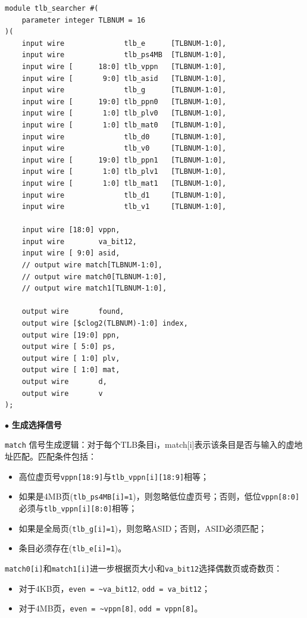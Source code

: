 \begin{lstlisting}
module tlb_searcher #(
    parameter integer TLBNUM = 16
)(
    input wire              tlb_e      [TLBNUM-1:0],
    input wire              tlb_ps4MB  [TLBNUM-1:0],
    input wire [      18:0] tlb_vppn   [TLBNUM-1:0],
    input wire [       9:0] tlb_asid   [TLBNUM-1:0],
    input wire              tlb_g      [TLBNUM-1:0],
    input wire [      19:0] tlb_ppn0   [TLBNUM-1:0],
    input wire [       1:0] tlb_plv0   [TLBNUM-1:0],
    input wire [       1:0] tlb_mat0   [TLBNUM-1:0],
    input wire              tlb_d0     [TLBNUM-1:0],
    input wire              tlb_v0     [TLBNUM-1:0],
    input wire [      19:0] tlb_ppn1   [TLBNUM-1:0],
    input wire [       1:0] tlb_plv1   [TLBNUM-1:0],
    input wire [       1:0] tlb_mat1   [TLBNUM-1:0],
    input wire              tlb_d1     [TLBNUM-1:0],
    input wire              tlb_v1     [TLBNUM-1:0],

    input wire [18:0] vppn,
    input wire        va_bit12,
    input wire [ 9:0] asid,
    // output wire match[TLBNUM-1:0],
    // output wire match0[TLBNUM-1:0],
    // output wire match1[TLBNUM-1:0],

    output wire       found,
    output wire [$clog2(TLBNUM)-1:0] index,
    output wire [19:0] ppn,
    output wire [ 5:0] ps,
    output wire [ 1:0] plv,
    output wire [ 1:0] mat,
    output wire       d,
    output wire       v
);
\end{lstlisting}

\noindent
$\bullet$
\textbf{生成选择信号}

\verb|match| 信号生成逻辑：对于每个TLB条目i，match[i]表示该条目是否与输入的虚地址匹配。匹配条件包括：

\begin{itemize}
    \item 高位虚页号\verb|vppn[18:9]|与\verb|tlb_vppn[i][18:9]|相等；
    \item 如果是4MB页(\verb|tlb_ps4MB[i]=1|)，则忽略低位虚页号；否则，低位\verb|vppn[8:0]|必须与\verb|tlb_vppn[i][8:0]|相等；
    \item 如果是全局页(\verb|tlb_g[i]=1|)，则忽略ASID；否则，ASID必须匹配；
    \item 条目必须存在(\verb|tlb_e[i]=1|)。
\end{itemize}

\verb|match0[i]|和\verb|match1[i]|进一步根据页大小和\verb|va_bit12|选择偶数页或奇数页：

\begin{itemize}
    \item 对于4KB页，\verb|even = ~va_bit12|, \verb|odd = va_bit12|；
    \item 对于4MB页，\verb|even = ~vppn[8]|, \verb|odd = vppn[8]|。
\end{itemize}


